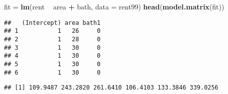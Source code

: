 \documentclass[ignorenonframetext,]{beamer}
\newenvironment{Shaded}{\begin{snugshade}}{\end{snugshade}}
\newcommand{\KeywordTok}[1]{\textcolor[rgb]{0.13,0.29,0.53}{\textbf{#1}}}
\newcommand{\DataTypeTok}[1]{\textcolor[rgb]{0.13,0.29,0.53}{#1}}
\newcommand{\StringTok}[1]{\textcolor[rgb]{0.31,0.60,0.02}{#1}}
\newcommand{\OperatorTok}[1]{\textcolor[rgb]{0.81,0.36,0.00}{\textbf{#1}}}
\newcommand{\NormalTok}[1]{#1}
\begin{document}
\begin{frame}[fragile]

\small

\begin{Shaded}
\begin{Highlighting}[]
\NormalTok{fit =}\StringTok{ }\KeywordTok{lm}\NormalTok{(rent }\OperatorTok{~}\StringTok{ }\NormalTok{area }\OperatorTok{+}\StringTok{ }\NormalTok{bath, }\DataTypeTok{data =}\NormalTok{ rent99)}
\KeywordTok{head}\NormalTok{(}\KeywordTok{model.matrix}\NormalTok{(fit))}
\end{Highlighting}
\end{Shaded}

\begin{verbatim}
##   (Intercept) area bath1
## 1           1   26     0
## 2           1   28     0
## 3           1   30     0
## 4           1   30     0
## 5           1   30     0
## 6           1   30     0
\end{verbatim}

\begin{Shaded}
\end{Shaded}

\begin{verbatim}
## [1] 109.9487 243.2820 261.6410 106.4103 133.3846 339.0256
\end{verbatim}

\normalsize

\end{frame}
\end{document}
